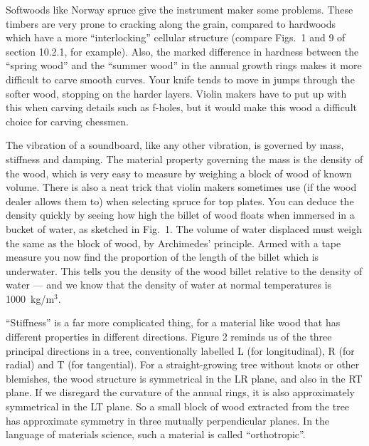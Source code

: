   Softwoods like Norway spruce give the instrument maker some problems. These 
  timbers are very prone to cracking along the grain, compared to hardwoods 
  which have a more “interlocking” cellular structure (compare Figs.\ 1 and 9 
  of section 10.2.1, for example). Also, the marked difference in hardness 
  between the “spring wood” and the “summer wood” in the annual growth rings 
  makes it more difficult to carve smooth curves. Your knife tends to move in 
  jumps through the softer wood, stopping on the harder layers. Violin makers 
  have to put up with this when carving details such as f-holes, but it would 
  make this wood a difficult choice for carving chessmen. 

  The vibration of a soundboard, like any other vibration, is governed by mass, 
  stiffness and damping. The material property governing the mass is the 
  density of the wood, which is very easy to measure by weighing a block of 
  wood of known volume. There is also a neat trick that violin makers sometimes 
  use (if the wood dealer allows them to) when selecting spruce for top plates. 
  You can deduce the density quickly by seeing how high the billet of wood 
  floats when immersed in a bucket of water, as sketched in Fig.\ 1. The volume 
  of water displaced must weigh the same as the block of wood, by Archimedes’ 
  principle. Armed with a tape measure you now find the proportion of the 
  length of the billet which is underwater. This tells you the density of the 
  wood billet relative to the density of water --- and we know that the density 
  of water at normal temperatures is 1000~kg/m$^3$. 


  “Stiffness” is a far more complicated thing, for a material like wood that 
  has different properties in different directions. Figure 2 reminds us of the 
  three principal directions in a tree, conventionally labelled L (for 
  longitudinal), R (for radial) and T (for tangential). For a straight-growing 
  tree without knots or other blemishes, the wood structure is symmetrical in 
  the LR plane, and also in the RT plane. If we disregard the curvature of the 
  annual rings, it is also approximately symmetrical in the LT plane. So a 
  small block of wood extracted from the tree has approximate symmetry in three 
  mutually perpendicular planes. In the language of materials science, such a 
  material is called “orthotropic”. 

